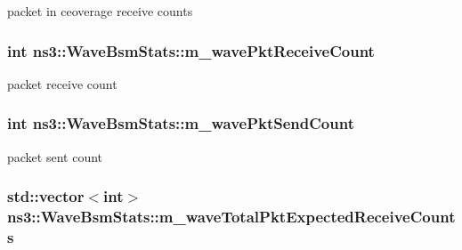 packet in ceoverage receive counts 

\subsubsection[{\texorpdfstring{m\+\_\+wave\+Pkt\+Receive\+Count}{m_wavePktReceiveCount}}]{\setlength{\rightskip}{0pt plus 5cm}int ns3\+::\+Wave\+Bsm\+Stats\+::m\+\_\+wave\+Pkt\+Receive\+Count\hspace{0.3cm}{\ttfamily [private]}}\hypertarget{classns3_1_1WaveBsmStats_a8e8c15e7797055950e951ab462d469bc}{}\label{classns3_1_1WaveBsmStats_a8e8c15e7797055950e951ab462d469bc}


packet receive count 

\subsubsection[{\texorpdfstring{m\+\_\+wave\+Pkt\+Send\+Count}{m_wavePktSendCount}}]{\setlength{\rightskip}{0pt plus 5cm}int ns3\+::\+Wave\+Bsm\+Stats\+::m\+\_\+wave\+Pkt\+Send\+Count\hspace{0.3cm}{\ttfamily [private]}}\hypertarget{classns3_1_1WaveBsmStats_a98ab74a0a89a3976158b06b7eaec462f}{}\label{classns3_1_1WaveBsmStats_a98ab74a0a89a3976158b06b7eaec462f}


packet sent count 

\subsubsection[{\texorpdfstring{m\+\_\+wave\+Total\+Pkt\+Expected\+Receive\+Counts}{m_waveTotalPktExpectedReceiveCounts}}]{\setlength{\rightskip}{0pt plus 5cm}std\+::vector$<$int$>$ ns3\+::\+Wave\+Bsm\+Stats\+::m\+\_\+wave\+Total\+Pkt\+Expected\+Receive\+Counts\hspace{0.3cm}{\ttfamily [private]}}\hypertarget{classns3_1_1WaveBsmStats_aca9a18f45f441e7682b4005ad5ffd93a}{}\label{classns3_1_1WaveBsmStats_aca9a18f45f441e7682b4005ad5ffd93a}


